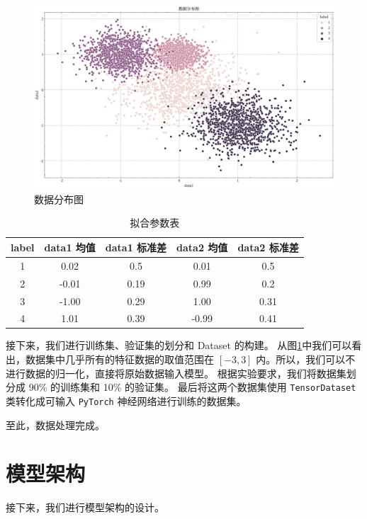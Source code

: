 \documentclass[supercite]{Experimental_Report}
\theoremstyle{definition}
\begin{document}
\begin{figure}[H]
	\begin{center}
		\includegraphics[scale=0.40]{../images/数据分布图.pdf}
		\caption{数据分布图}
		\label{数据分布图}
	\end{center}
\end{figure}
\begin{table}[H]
	\centering
	\caption{拟合参数表}
	  \begin{tabular}{ccccc}
		\toprule
	  \textbf{label} & \textbf{data1 均值} & \textbf{data1 标准差} & \textbf{data2 均值} & \textbf{data2 标准差} \\\hline
	  1     & 0.02  & 0.5   & 0.01  & 0.5 \\
	  2     & -0.01 & 0.19  & 0.99  & 0.2 \\
	  3     & -1.00    & 0.29  & 1.00     & 0.31 \\
	  4     & 1.01  & 0.39  & -0.99 & 0.41 \\
	  \bottomrule
	  \end{tabular}
	\label{拟合参数}
  \end{table}
  
接下来，我们进行训练集、验证集的划分和 Dataset 的构建。
从图\ref{数据分布图}中我们可以看出，数据集中几乎所有的特征数据的取值范围在 $[-3, 3]$ 内。所以，我们可以不进行数据的归一化，直接将原始数据输入模型。
根据实验要求，我们将数据集划分成 90\% 的训练集和 10\% 的验证集。
最后将这两个数据集使用 \texttt{TensorDataset} 类转化成可输入 \texttt{PyTorch} 神经网络进行训练的数据集。

至此，数据处理完成。
\section{模型架构}
接下来，我们进行模型架构的设计。
\end{document}
